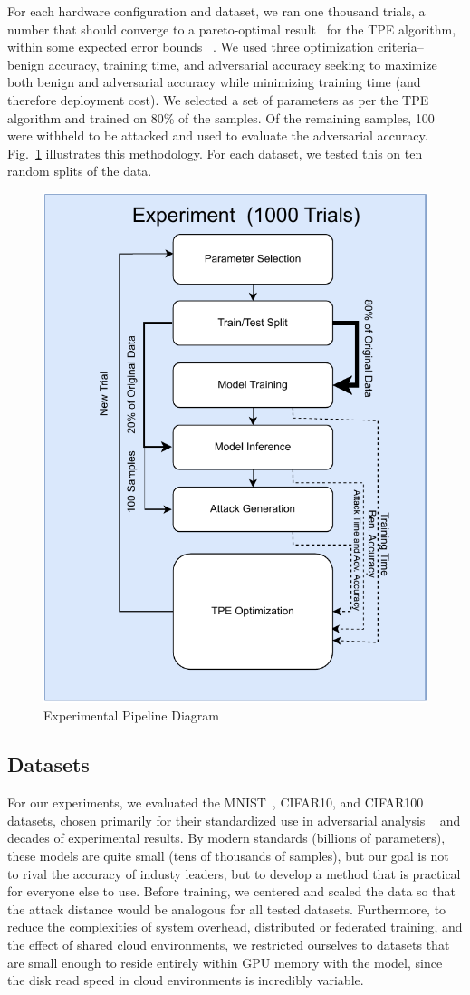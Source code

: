 \documentclass[conference]{IEEEtran}
\begin{document}
For each hardware configuration and dataset, we ran one thousand trials, a number that should converge to a pareto-optimal result~\cite{ozaki2020multiobjective,zitzler2008quality} for the TPE algorithm, within some expected error bounds ~\cite{legriel2010approximating}. We used three optimization criteria-- benign accuracy, training time, and adversarial accuracy seeking to maximize both benign and adversarial accuracy while minimizing training time (and therefore deployment cost). We selected a set of parameters as per the TPE algorithm and trained on 80\% of the samples. Of the remaining samples, 100 were withheld to be attacked and used to evaluate the adversarial accuracy. Fig.~\ref{fig:experiments} illustrates this methodology. For each dataset, we tested this on ten random splits of the data. 

\begin{figure}
    \centering
    \includegraphics[width=.45\textwidth]{plots/experiment.pdf}
    \caption{Experimental Pipeline Diagram}
    \label{fig:experiments}
\end{figure}


\subsection{Datasets}
For our experiments, we evaluated the MNIST~\cite{mnist}, CIFAR10\cite{cifar}, and CIFAR100\cite{cifar} datasets, chosen primarily for their standardized use in adversarial analysis ~\cite{madry2017towards,croce_reliable_2020,carlini_towards_2017,deepfool} and decades of experimental results. By modern standards (billions of parameters), these models are quite small (tens of thousands of samples), but our goal is not to rival the accuracy of industy leaders, but to develop a method that is practical for everyone else to use.
Before training, we centered and scaled the data so that the attack distance would be analogous for all tested datasets. Furthermore, to reduce the complexities of system overhead, distributed or federated training, and the effect of shared cloud environments, we restricted ourselves to datasets that are small enough to reside entirely within GPU memory with the model, since the disk read speed in cloud environments is incredibly variable. 
\end{document}
